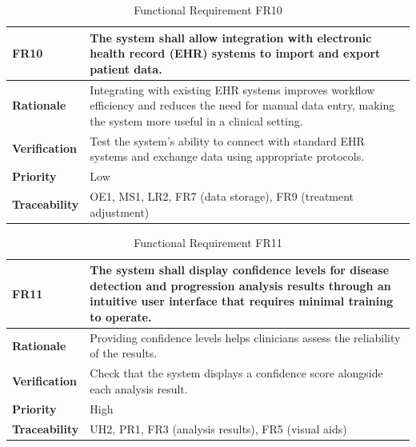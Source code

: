 \documentclass[12pt]{article}
\begin{document}
\begin{table}[h!]
\centering
{}
\begin{tabular}{|p{3.5cm}|p{11.5cm}|}
\hline
\rowcolor{gray!30}
\textbf{FR10} & The system shall allow integration with electronic health record (EHR) systems to import and export patient data. \\
\hline
\textbf{Rationale} & Integrating with existing EHR systems improves workflow efficiency and reduces the need for manual data entry, making the system more useful in a clinical setting. \\
\hline
\textbf{Verification} & Test the system’s ability to connect with standard EHR systems and exchange data using appropriate protocols. \\
\hline
\textbf{Priority} & Low \\
\hline
\textbf{Traceability} & OE1, MS1, LR2, FR7 (data storage), FR9 (treatment adjustment) \\
\hline
\end{tabular}
\caption{Functional Requirement FR10}
\end{table}
\begin{table}[h!]
\centering
{}
\begin{tabular}{|p{3.5cm}|p{11.5cm}|}
\hline
\rowcolor{gray!30}
\textbf{FR11} & The system shall display confidence levels for disease detection and progression analysis results through an intuitive user interface that requires minimal training to operate. \\
\hline
\textbf{Rationale} & Providing confidence levels helps clinicians assess the reliability of the results. \\
\hline
\textbf{Verification} & Check that the system displays a confidence score alongside each analysis result. \\
\hline
\textbf{Priority} & High \\
\hline
\textbf{Traceability} & UH2, PR1, FR3 (analysis results), FR5 (visual aids) \\
\hline
\end{tabular}
\caption{Functional Requirement FR11}
\end{table}
\end{document}
